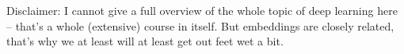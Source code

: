\documentclass[compress]{beamer}
\begin{document}
\begin{frame}[standout]
	Disclaimer: I cannot give a full overview of the whole topic of deep learning here -- that's a whole (extensive) course in itself. But embeddings are closely related, that's why we at least will at least get out feet wet a bit.
\end{frame}



\begin{frame}[plain]
	\printbibliography
\end{frame}
\end{document}
